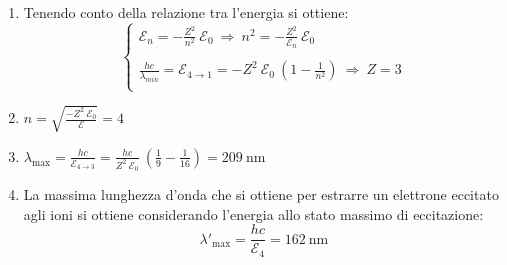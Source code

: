 \documentclass[12pt,twoside,a4]{article}
\begin{document}
\newpage
\begin{solution}

\begin{enumerate}[label=(\textit{\roman*})]
	\item Tenendo conto della relazione tra l'energia si ottiene:
\begin{equation*}\begin{cases}
 \mathcal{E}_n = - \frac{Z^2}{n^2} \ \mathcal{E}_0  \   \Rightarrow  \  n^2 = - \frac{Z^2}{\mathcal{E}_n} \ \mathcal{E}_0 \\ 
 \\
 \frac{h c }{\lambda_{min}} = \mathcal{E}_{4\rightarrow 1} = - Z^2 \ \mathcal{E}_0 \ \left(1 - \frac{1}{n^2}\right)  \  \Rightarrow  \   Z = 3  \\
 \end{cases} 
\end{equation*}

\item $n = \sqrt{\frac{- Z^2 \ \mathcal{E}_0}{\mathcal{E}}} = 4$
\item $\lambda_{\mathrm{max}} = \frac{h c}{\mathcal{E}_{4 \rightarrow 3}} = \frac{h c}{Z^2 \ \mathcal{E}_0} \ \left(\frac{1}{9} - \frac{1}{16}\right) = 209 \ \mathrm{nm}$

\item La massima lunghezza d'onda che si ottiene per estrarre un elettrone eccitato agli ioni si ottiene considerando l'energia allo stato massimo di eccitazione: 
\begin{equation*}
 \lambda'_{\mathrm{max}} = \frac{h c }{\mathcal{E}_4} = 162  \ \mathrm{nm}  
\end{equation*}
\end{enumerate}
\end{solution}
\end{document}

